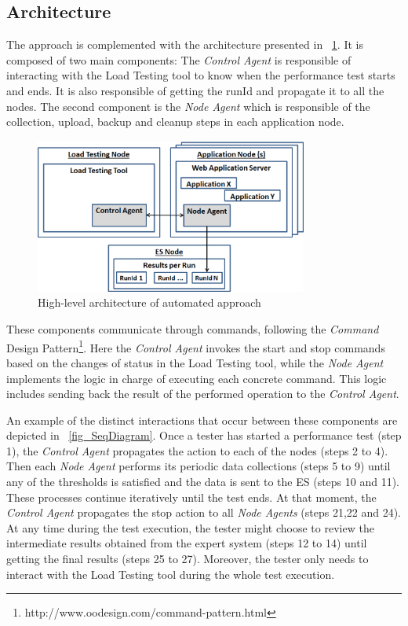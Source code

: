 \documentclass[runningheads,a4paper]{llncs}
\begin{document}
\vspace{-7pt}
\subsection{Architecture}
\vspace{-7pt}
The approach is complemented with the architecture
presented in \figurename ~\ref{fig_Arch}. It is composed of two main components:
The \emph{Control Agent} is responsible of interacting with the Load
Testing tool to know when the performance test starts and ends. It is also
responsible of getting the runId and propagate it to all the nodes. The second
component is the \emph{Node Agent} which is responsible of the collection,
upload, backup and cleanup steps in each application node. 

\begin{figure}[!h]
\centering
\includegraphics[totalheight=.22\textheight,width=0.8\textwidth]{architecture_dwait}
\caption{High-level architecture of automated approach}
\label{fig_Arch}
\end{figure}

These components communicate through commands, following the \emph{Command}
Design Pattern\footnote{http://www.oodesign.com/command-pattern.html}. Here the
\emph{Control Agent} invokes the start and stop commands based on the
changes of status in the Load Testing tool, while the \emph{Node Agent}
implements the logic in charge of executing each concrete command. This logic
includes sending back the result of the performed operation to the \emph{Control
Agent}.

An example of the distinct interactions that occur between these
components are depicted in \figurename ~\ref{fig_SeqDiagram}. Once a tester has
started a performance test (step 1), the \emph{Control Agent} propagates the
action to each of the nodes (steps 2 to 4). Then each \emph{Node Agent} performs
its periodic data collections (steps 5 to 9) until any of the thresholds is
satisfied and the data is sent to the ES (steps 10 and 11). These processes
continue iteratively until the test ends. At that moment, the \emph{Control
Agent} propagates the stop action to all \emph{Node Agents} (steps 21,22 and
24). At any time during the test execution, the tester might choose to review
the intermediate results obtained from the expert system (steps 12 to 14) until
getting the final results (steps 25 to 27). Moreover, the tester only needs to
interact with the Load Testing tool during the whole test execution.
\end{document}
